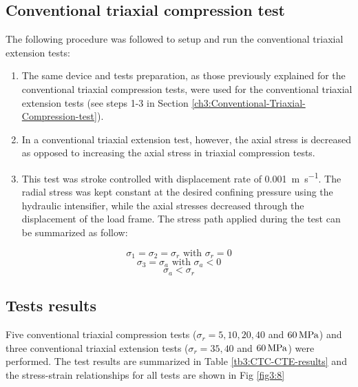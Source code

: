 \subsection{Conventional triaxial compression test}

The following procedure was followed to setup and run the conventional triaxial extension tests:

\begin{enumerate}
    \item The same device and tests preparation, as those previously explained for the conventional triaxial compression tests, were used for the conventional triaxial extension tests (see steps 1-3 in Section \ref{ch3:Conventional-Triaxial-Compression-test}).
    \item In a conventional triaxial extension test, however, the axial stress is decreased as opposed to increasing the axial stress in triaxial compression tests. 
    \item This test was stroke controlled with displacement rate of \SI{0.001}{\meter\per\second}. The radial stress was kept constant at the desired confining pressure using the hydraulic intensifier, while the axial stresses decreased through the displacement of the load frame. The stress path applied during the test can be summarized as follow:
\end{enumerate}
\begin{equation}
    \sigma_1 = \sigma_2 = \sigma_r  \text{ with } \sigma_r = 0 
\end{equation}
\begin{equation}
    \sigma_3 = \sigma_a \text{ with } \sigma_a < 0  
\end{equation}
\begin{equation}
    \sigma_a < \sigma_r
\end{equation}

\subsection{Tests results}

Five conventional triaxial compression tests ($\sigma_r =  5,10,20,40$ and $\SIlist{60}{MPa}$) and three conventional triaxial extension tests ($\sigma_r = 35,40$ and $\SIlist{60}{MPa}$) were performed. The test results are summarized in Table \ref{tb3:CTC-CTE-results} and the stress-strain relationships for all tests are shown in Fig \ref{fig3:8}

